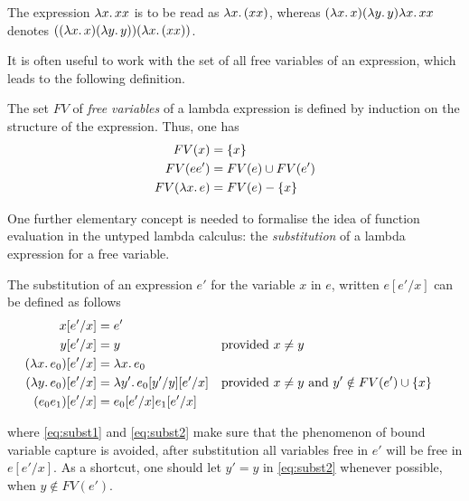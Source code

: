 \begin{expl}
The expression ${\lambda x.\,xx}$ is to be read as ${\lambda x.\,(xx)}$,
whereas $({\lambda x.\,x})({\lambda y.\,y}){\lambda x.\,xx}$ denotes 
$(({\lambda x.\,x})({\lambda y.\,y}))({\lambda x.\,(xx)})$.
\end{expl}

It is often useful
to work with the set of all free variables of an expression, which leads to the 
following definition.
\begin{defn}
The set $FV$ of \emph{free variables} of a lambda expression is defined by
induction on the structure of the expression. Thus, one has
\begin{equation}
\begin{split}
 FV(x) ={} & \{x\}\\
 FV(ee') ={}& FV(e) \cup FV(e')\\
 FV({\lambda x.\,e}) ={}& FV(e) - \{x\}
\end{split}
\end{equation}
\end{defn}

One further elementary concept is needed to formalise the idea of function
evaluation in the untyped lambda calculus: the \emph{substitution} of a lambda
expression for a free variable. 
\begin{defn}
The substitution of an expression $e'$ for the
variable $x$ in $e$, written $e[e'/x]$ can be defined as follows
\begin{align}
  x[e'/x] &= e'\\
  y[e'/x] &= y   && \text{provided } x \neq y\\
  ({\lambda x.\,e_0})[e'/x] &= {\lambda x.\,e_0} \label{eq:subst1}\\
  ({\lambda y.\,e_0})[e'/x] &=  {\lambda y'.\,e_0[y'/y][e'/x]} &&
  \text{provided } x \neq y \text{ and } y' \notin FV(e') \cup \{x\}  \label{eq:subst2}\\
  (e_0 e_1)[e'/x] &= e_0[e'/x] e_1[e'/x]
\end{align}

where \eqref{eq:subst1} and \eqref{eq:subst2} make sure that the phenomenon of
bound variable capture is avoided, \IE after substitution all variables free in
$e'$ will be free in $e[e'/x]$. As a shortcut, one should let $y' = y$ in
\eqref{eq:subst2} whenever possible, \IE when $y \notin FV(e')$. 
\end{defn}


